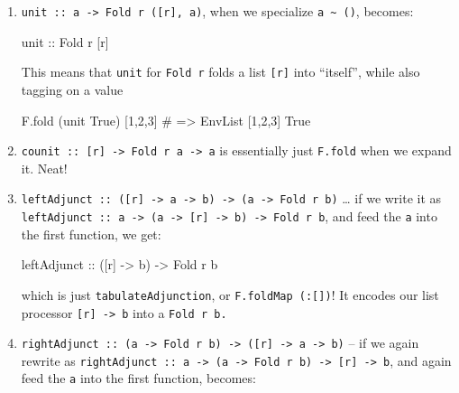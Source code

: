 \documentclass[]{article}
\newenvironment{Shaded}{}{}
\newcommand{\DataTypeTok}[1]{\textcolor[rgb]{0.56,0.13,0.00}{#1}}
\newcommand{\DecValTok}[1]{\textcolor[rgb]{0.25,0.63,0.44}{#1}}
\newcommand{\NormalTok}[1]{#1}
\newcommand{\OtherTok}[1]{\textcolor[rgb]{0.00,0.44,0.13}{#1}}
\newcommand{\PreprocessorTok}[1]{\textcolor[rgb]{0.74,0.48,0.00}{#1}}
\begin{document}
\begin{enumerate}
\def\labelenumi{\arabic{enumi}.}
\item
  \texttt{unit\ ::\ a\ -\textgreater{}\ Fold\ r\ ({[}r{]},\ a)}, when we
  specialize \texttt{a\ \textasciitilde{}\ ()}, becomes:

\begin{Shaded}
\begin{Highlighting}[]
\OtherTok{unit ::} \DataTypeTok{Fold}\NormalTok{ r [r]}
\end{Highlighting}
\end{Shaded}

  This means that \texttt{unit} for \texttt{Fold\ r} folds a list
  \texttt{{[}r{]}} into ``itself'', while also tagging on a value

\begin{Shaded}
\begin{Highlighting}[]
\NormalTok{F.fold (unit }\DataTypeTok{True}\NormalTok{) [}\DecValTok{1}\NormalTok{,}\DecValTok{2}\NormalTok{,}\DecValTok{3}\NormalTok{]}
\PreprocessorTok{\#   =\textgreater{} EnvList [1,2,3] True}
\end{Highlighting}
\end{Shaded}
\item
  \texttt{counit\ ::\ {[}r{]}\ -\textgreater{}\ Fold\ r\ a\ -\textgreater{}\ a}
  is essentially just \texttt{F.fold} when we expand it. Neat!
\item
  \texttt{leftAdjunct\ ::\ ({[}r{]}\ -\textgreater{}\ a\ -\textgreater{}\ b)\ -\textgreater{}\ (a\ -\textgreater{}\ Fold\ r\ b)}
  \ldots{} if we write it as
  \texttt{leftAdjunct\ ::\ a\ -\textgreater{}\ (a\ -\textgreater{}\ {[}r{]}\ -\textgreater{}\ b)\ -\textgreater{}\ Fold\ r\ b},
  and feed the \texttt{a} into the first function, we get:

\begin{Shaded}
\begin{Highlighting}[]
\OtherTok{leftAdjunct\textquotesingle{} ::}\NormalTok{ ([r] }\OtherTok{{-}\textgreater{}}\NormalTok{ b) }\OtherTok{{-}\textgreater{}} \DataTypeTok{Fold}\NormalTok{ r b}
\end{Highlighting}
\end{Shaded}

  which is just \texttt{tabulateAdjunction}, or \texttt{F.foldMap\ (:{[}{]})}!
  It encodes our list processor \texttt{{[}r{]}\ -\textgreater{}\ b} into a
  \texttt{Fold\ r\ b.}
\item
  \texttt{rightAdjunct\ ::\ (a\ -\textgreater{}\ Fold\ r\ b)\ -\textgreater{}\ ({[}r{]}\ -\textgreater{}\ a\ -\textgreater{}\ b)}
  -- if we again rewrite as
  \texttt{rightAdjunct\ ::\ a\ -\textgreater{}\ (a\ -\textgreater{}\ Fold\ r\ b)\ -\textgreater{}\ {[}r{]}\ -\textgreater{}\ b},
  and again feed the \texttt{a} into the first function, becomes:


\end{enumerate}
\end{document}
